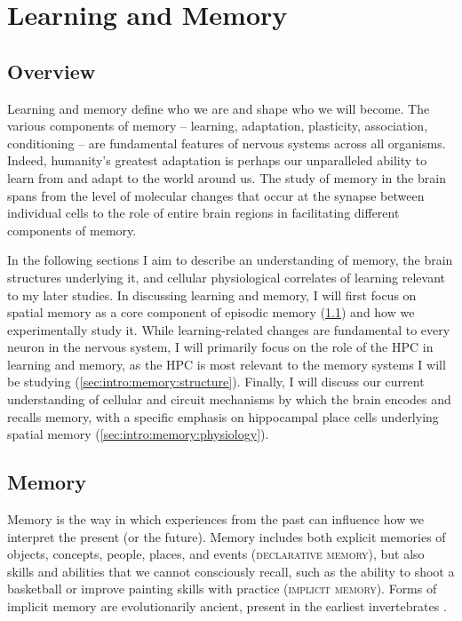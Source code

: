 \acresetall
\chapter{Learning and Memory}
\label{ch:intro:memory}
\section*{Overview}
Learning and memory define who we are and shape who we will become.
The various components of memory -- learning, adaptation, plasticity, association, conditioning -- are fundamental features of nervous systems across all organisms.
Indeed, humanity's greatest adaptation is perhaps our unparalleled ability to learn from and adapt to the world around us.
The study of memory in the brain spans from the level of molecular changes that occur at the synapse between individual cells to the role of entire brain regions in facilitating different components of memory.

In the following sections I aim to describe an understanding of memory, the brain structures underlying it, and cellular physiological correlates of learning relevant to my later studies.
In discussing learning and memory, I will first focus on spatial memory as a core component of episodic memory (\ref{sec:intro:memory:memory}) and how we experimentally study it.
While learning-related changes are fundamental to every neuron in the nervous system, I will primarily focus on the role of the \ac{HPC} in learning and memory, as the \ac{HPC} is most relevant to the memory systems I will be studying (\ref{sec:intro:memory:structure}).
Finally, I will discuss our current understanding of cellular and circuit mechanisms by which the brain encodes and recalls memory, with a specific emphasis on hippocampal place cells underlying spatial memory (\ref{sec:intro:memory:physiology}).

\section{Memory}\label{sec:intro:memory:memory}
Memory is the way in which experiences from the past can influence how we interpret the present (or the future).
Memory includes both explicit memories of objects, concepts, people, places, and events (\textsc{declarative memory}), but also skills and abilities that we cannot consciously recall, such as the ability to shoot a basketball or improve painting skills with practice (\textsc{implicit memory}).
Forms of implicit memory are evolutionarily ancient, present in the earliest invertebrates \citep{Milner1998}.

